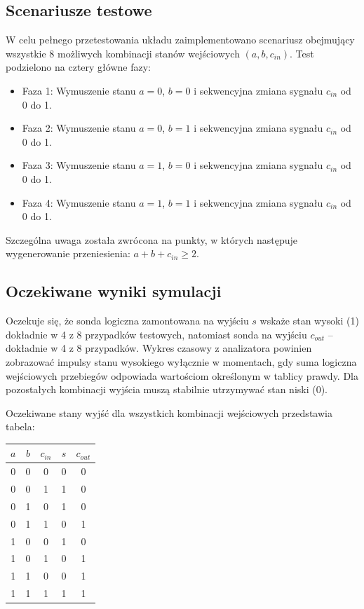 \documentclass[12pt,a4paper]{article}
\begin{document}
\subsection{Scenariusze testowe}

W celu pełnego przetestowania układu zaimplementowano scenariusz obejmujący wszystkie 8 możliwych kombinacji stanów wejściowych $(a, b, c_{in})$. Test podzielono na cztery główne fazy:

\begin{itemize}
    \item Faza 1: Wymuszenie stanu $a = 0$, $b = 0$ i sekwencyjna zmiana sygnału $c_{in}$ od 0 do 1.
    \item Faza 2: Wymuszenie stanu $a = 0$, $b = 1$ i sekwencyjna zmiana sygnału $c_{in}$ od 0 do 1.
    \item Faza 3: Wymuszenie stanu $a = 1$, $b = 0$ i sekwencyjna zmiana sygnału $c_{in}$ od 0 do 1.
    \item Faza 4: Wymuszenie stanu $a = 1$, $b = 1$ i sekwencyjna zmiana sygnału $c_{in}$ od 0 do 1.
\end{itemize}

Szczególna uwaga została zwrócona na punkty, w których następuje wygenerowanie przeniesienia: $a + b + c_{in} \geq 2$.

\subsection{Oczekiwane wyniki symulacji}

Oczekuje się, że sonda logiczna zamontowana na wyjściu $s$ wskaże stan wysoki (1) dokładnie w 4 z 8 przypadków testowych, natomiast sonda na wyjściu $c_{out}$ -- dokładnie w 4 z 8 przypadków. Wykres czasowy z analizatora powinien zobrazować impulsy stanu wysokiego wyłącznie w momentach, gdy suma logiczna wejściowych przebiegów odpowiada wartościom określonym w tablicy prawdy. Dla pozostałych kombinacji wyjścia muszą stabilnie utrzymywać stan niski (0).

Oczekiwane stany wyjść dla wszystkich kombinacji wejściowych przedstawia tabela:

\begin{center}
\begin{tabular}{|c|c|c|c|c|}
\hline
$a$ & $b$ & $c_{in}$ & $s$ & $c_{out}$ \\
\hline
0 & 0 & 0 & 0 & 0 \\
0 & 0 & 1 & 1 & 0 \\
0 & 1 & 0 & 1 & 0 \\
0 & 1 & 1 & 0 & 1 \\
1 & 0 & 0 & 1 & 0 \\
1 & 0 & 1 & 0 & 1 \\
1 & 1 & 0 & 0 & 1 \\
1 & 1 & 1 & 1 & 1 \\
\hline
\end{tabular}
\end{center}
\end{document}
